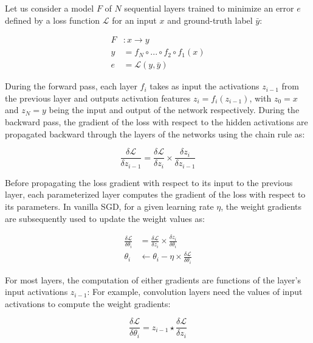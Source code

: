 \documentclass[11pt,onecolumn]{article}
\begin{document}
Let us consider a model $F$ of $N$ sequential layers trained to minimize an error $e$ 
defined by a loss function $\mathcal{L}$ for an input $x$ and ground-truth label $\bar{y}$:

\begin{subequations}
	\begin{align}
	F &: x \rightarrow y \\
	y &= f_N \circ ... \circ f_2 \circ f_1(x) \\
	e &=  \mathcal{L}(y, \bar{y})
	\end{align}
\end{subequations}

During the forward pass, each layer $f_i$ takes as input the activations $z_{i-1}$ from the previous layer and outputs activation features $z_i=f_i(z_{i-1})$, with $z_0=x$ and $z_N=y$ being the input and output of the network respectively.
During the backward pass, the gradient of the loss with respect to the hidden activations are propagated backward through the layers of the networks using the chain rule as:

\begin{equation}
\frac{\delta \mathcal{L}}{\delta z_{i-1}} = \frac{\delta \mathcal{L}}{\delta z_{i}}  \times \frac{\delta z_{i}}{\delta z_{i-1}}
\end{equation}

Before propagating the loss gradient with respect to its input to the previous layer, 
each parameterized layer computes the gradient of the loss with respect to its parameters. 
In vanilla SGD, for a given learning rate $\eta$, the weight gradients are subsequently used to update the weight values as:

\begin{subequations}
	\begin{align}
	\frac{\delta \mathcal{L}}{\delta \theta_i} & =\frac{\delta \mathcal{L}}{\delta z_{i}}  \times \frac{\delta z_{i}}{\delta \theta_i} \\
	\theta_i & \leftarrow \theta_i - \eta \times \frac{\delta \mathcal{L}}{\delta \theta_i}
	\end{align}
\end{subequations}

For most layers, the computation of either gradients are functions of the layer's input activations $z_{i-1}$:
For example, convolution layers need the values of input activations to compute the weight gradients:

\begin{equation}
\frac{\delta \mathcal{L}}{\delta \theta_i} = z_{i-1} \star \frac{\delta \mathcal{L}}{\delta z_i} 
\end{equation}
\end{document}

